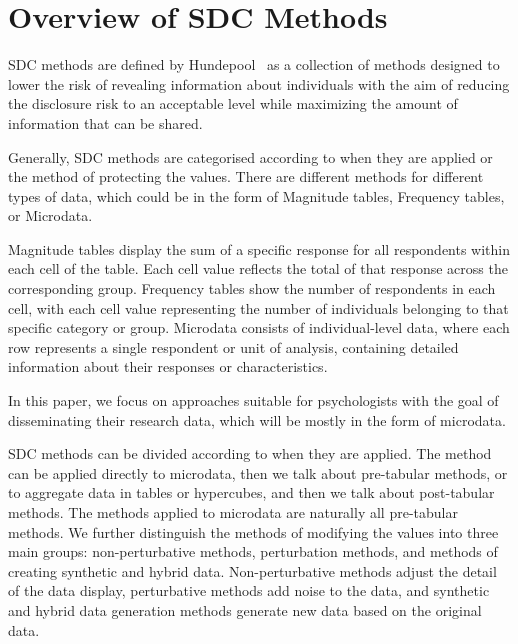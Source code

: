 \documentclass{article}
\begin{document}
\vspace*{15cm}


\section{Overview of SDC Methods}

SDC methods are defined by Hundepool~\cite{2012_Hundepool} as a collection of methods designed to lower the risk of revealing information about individuals with the aim of reducing the disclosure risk to an acceptable level while maximizing the amount of information that can be shared.

Generally, SDC methods are categorised according to when they are applied or the method of protecting the values. There are different methods for different types of data, which could be in the form of Magnitude tables, Frequency tables, or Microdata.

Magnitude tables display the sum of a specific response for all respondents within each cell of the table. Each cell value reflects the total of that response across the corresponding group.
Frequency tables show the number of respondents in each cell, with each cell value representing the number of individuals belonging to that specific category or group.
Microdata consists of individual-level data, where each row represents a single respondent or unit of analysis, containing detailed information about their responses or characteristics.

In this paper, we focus on approaches suitable for psychologists with the goal of disseminating their research data, which will be mostly in the form of microdata.


SDC methods can be divided according to when they are applied. The method can be applied directly to microdata, then we talk about pre-tabular methods, or to aggregate data in tables or hypercubes, and then we talk about post-tabular methods. The methods applied to microdata are naturally all pre-tabular methods.
We further distinguish the methods of modifying the values into three main groups: non-perturbative methods, perturbation methods, and methods of creating synthetic and hybrid data. Non-perturbative methods adjust the detail of the data display, perturbative methods add noise to the data, and synthetic and hybrid data generation methods generate new data based on the original data. 
\end{document}
